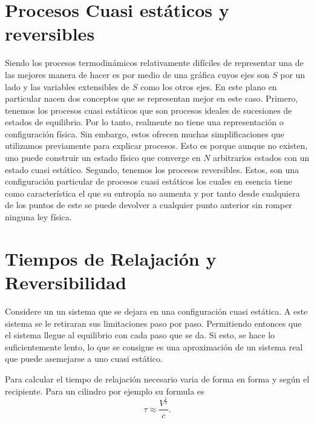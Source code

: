 \documentclass{report}
\begin{document}
\section{Procesos Cuasi estáticos y reversibles}\label{4.2}

Siendo los procesos termodinámicos relativamente difíciles de representar una de las mejores manera de hacer
es por medio de una gráfica cuyos ejes son $S$ por un lado y las variables extensibles de $S$ como los otros ejes.
En este plano en particular nacen dos conceptos que se representan mejor en este caso.
Primero, tenemos los procesos cuasi estáticos que son procesos ideales de sucesiones de estados de equilibrio.
Por lo tanto, realmente no tiene una representación o configuración física. Sin embargo, estos ofrecen muchas
simplificaciones que utilizamos previamente para explicar procesos. Esto es porque aunque no existen, uno
puede construir un estado físico que converge en $N$ arbitrarios estados con un estado cuasi estático.
Segundo, tenemos los procesos reversibles. Estos, son una configuración particular de procesos cuasi estáticos
los cuales en esencia tiene como característica el que su entropía no aumenta y por tanto desde cualquiera de
los puntos de este se puede devolver a cualquier punto anterior sin romper ninguna ley física.

\section{Tiempos de Relajación y Reversibilidad}\label{4.3}

Considere un un sistema que se dejara en una configuración cuasi estática. A este sistema se le retiraran sus limitaciones paso por paso. Permitiendo entonces que el sistema llegue al equilibrio con cada paso que se da. Si esto, se hace lo suficientemente lento, lo que se consigue es una aproximación de un sistema real que puede asemejarse a uno cuasi estático.


Para calcular el tiempo de relajación necesario varia de forma en forma y según el recipiente. Para un cilindro por ejemplo su formula es \[
  \tau \approx \frac{V^{\frac{1}{3}}}{c}
.\]
\end{document}
